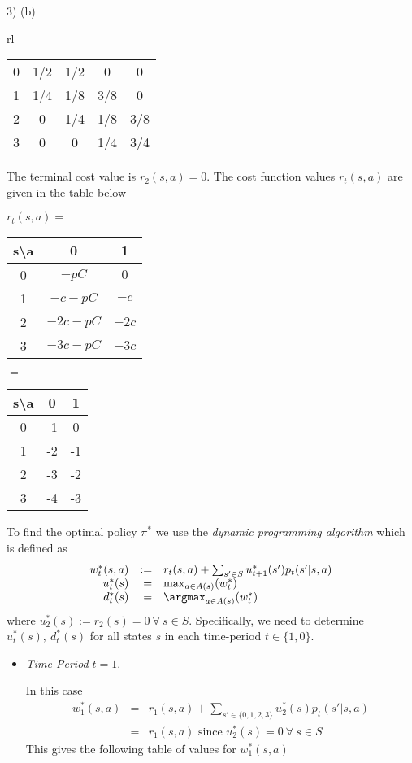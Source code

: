 \documentclass[11pt,a4paper]{article}
\begin{document}
\begin{answer}{3) (b)}
\begin{adjustwidth}{-2cm}{}
\begin{tabular}{rl}
\begin{tabular}{c|cccc}
        0&1/2&1/2&0&0\\
        1&1/4&1/8&3/8&0&\\
        2&0&1/4&1/8&3/8&\\
        3&0&0&1/4&3/4
      \end{tabular}
    \end{tabular}
  \end{adjustwidth}
  The terminal cost value is $r_2(s,a)=0$. The cost function values $r_t(s,a)$ are given in the table below
  \begin{center}
    $r_t(s,a)=$\begin{tabular}{c|cc}
      s\textbackslash a&0&1\\\hline
      0&$-pC$&$0$\\
      1&$-c-pC$&$-c$\\
      2&$-2c-pC$&$-2c$\\
      3&$-3c-pC$&$-3c$\\
    \end{tabular}
    $=$
    \begin{tabular}{c|cc}
      s\textbackslash a&0&1\\\hline
      0&-1&0\\
      1&-2&-1\\
      2&-3&-2\\
      3&-4&-3
    \end{tabular}
  \end{center}
  To find the optimal policy $\pi^*$ we use the \textit{dynamic programming algorithm} which is defined as
  \[\begin{array}{rrl}
    w_t^*(s,a)&:=&r_t(s,a)+\sum_{s'\in S}u_{t+1}^*(s')p_t(s'|s,a)\\
    u_t^*(s)&=&\max_{a\in A(s)}(w_t^*)\\
    d_t^*(s)&=&\argmax_{a\in A(s)}(w_t^*)
  \end{array}\]
  where $u_2^*(s):=r_2(s)=0\ \forall\ s\in S$. Specifically, we need to determine $u_t^*(s),\ d_t^*(s)$ for all states $s$ in each time-period $t\in\{1,0\}$.
  \begin{itemize}
    \item \textit{Time-Period} $t=1$.
    \par In this case
    \[\begin{array}{rcl}
      w_1^*(s,a)&=&r_1(s,a)+\sum_{s'\in\{0,1,2,3\}}u_2^*(s)p_t(s'|s,a)\\
      &=&r_1(s,a)\text{ since }u_2^*(s)=0\ \forall\ s\in S
    \end{array}\]
    This gives the following table of values for $w_1^*(s,a)$

\end{itemize}
\end{answer}
\end{document}
